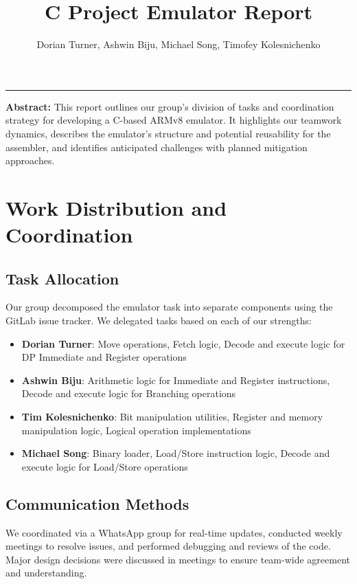 \documentclass[9.5pt]{article}
\title{C Project Emulator Report}
\author{Dorian Turner, Ashwin Biju, Michael Song, Timofey Kolesnichenko}
\date{}
\begin{document}
\maketitle
\vspace{-45pt}
\rule{\linewidth}{0.4pt}

\vspace{-0.5em}
\noindent\textbf{Abstract:} This report outlines our group's division of tasks and coordination strategy for developing a C-based ARMv8 emulator. It highlights our teamwork dynamics, describes the emulator’s structure and potential reusability for the assembler, and identifies anticipated challenges with planned mitigation approaches.
\vspace{0em}

\section{Work Distribution and Coordination}
\subsection{Task Allocation}
Our group decomposed the emulator task into separate components using the GitLab issue tracker. We delegated tasks based on each of our strengths:

\begin{itemize}[leftmargin=1.5em, itemsep=0pt, topsep=0pt]
    \item \textbf{Dorian Turner}: Move operations, Fetch logic, Decode and execute logic for DP Immediate and Register operations
    \item \textbf{Ashwin Biju}: Arithmetic logic for Immediate and Register instructions, Decode and execute logic for Branching operations
    \item \textbf{Tim Kolesnichenko}: Bit manipulation utilities, Register and memory manipulation logic, Logical operation implementations
    \item \textbf{Michael Song}: Binary loader, Load/Store instruction logic, Decode and execute logic for Load/Store operations
\end{itemize}

\subsection{Communication Methods}
We coordinated via a WhatsApp group for real-time updates, conducted weekly meetings to resolve issues, and performed debugging and reviews of the code. Major design decisions were discussed in meetings to ensure team-wide agreement and understanding.
\end{document}
